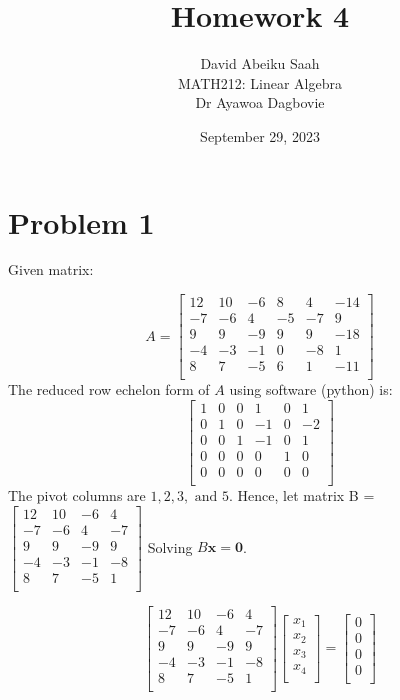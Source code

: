 \documentclass[12pt, a4paper]{article}
\title{
    \textbf{Homework 4} \\ \vspace{1cm}
}
\author{
\vspace*{0.5cm}
    David Abeiku Saah \\ \vspace{0.4cm}
    MATH212: Linear Algebra \\ \vspace{0.5cm}
    Dr Ayawoa Dagbovie \\
}
\date{September 29, 2023}
\begin{document}
\maketitle

\newpage

\section*{Problem 1}

Given matrix:

\[
    A = \begin{bmatrix}
        12 & 10 & -6 & 8 & 4 & -14 \\
        -7 & -6 & 4 & -5 & -7 & 9 \\
        9 & 9 & -9 & 9 & 9 & -18 \\
        -4 & -3 & -1 & 0 & -8 & 1 \\
        8 & 7 & -5 & 6 & 1 & -11 \\
    \end{bmatrix}
\]
The reduced row echelon form of $A$ using software (python) is:
\[
    \begin{bmatrix}
        1 & 0 & 0 & 1 & 0 & 1 \\
        0 & 1 & 0 & -1 & 0 & -2 \\
        0 & 0 & 1 & -1 & 0 & 1 \\
        0 & 0 & 0 & 0 & 1 & 0 \\
        0 & 0 & 0 & 0 & 0 & 0 \\
    \end{bmatrix}
\]
The pivot columns are $1, 2, 3,\text{ and } 5$. Hence, let matrix B = $\begin{bmatrix}
    12 & 10 & -6 & 4 \\
    -7 & -6 & 4 & -7 \\
    9 & 9 & -9 & 9 \\
    -4 & -3 & -1 & -8 \\
    8 & 7 & -5 & 1 \\
\end{bmatrix}$
Solving $B\boldsymbol{x}=\boldsymbol{0}$.

\[
    \begin{bmatrix}
        12 & 10 & -6 & 4 \\
        -7 & -6 & 4 & -7 \\
        9 & 9 & -9 & 9 \\
        -4 & -3 & -1 & -8 \\
        8 & 7 & -5 & 1 \\
    \end{bmatrix} \begin{bmatrix}
        x_1 \\
        x_2 \\
        x_3 \\
        x_4 \\
    \end{bmatrix} = \begin{bmatrix}
        0 \\
        0 \\
        0 \\
        0 \\
    \end{bmatrix}
\]
\end{document}
